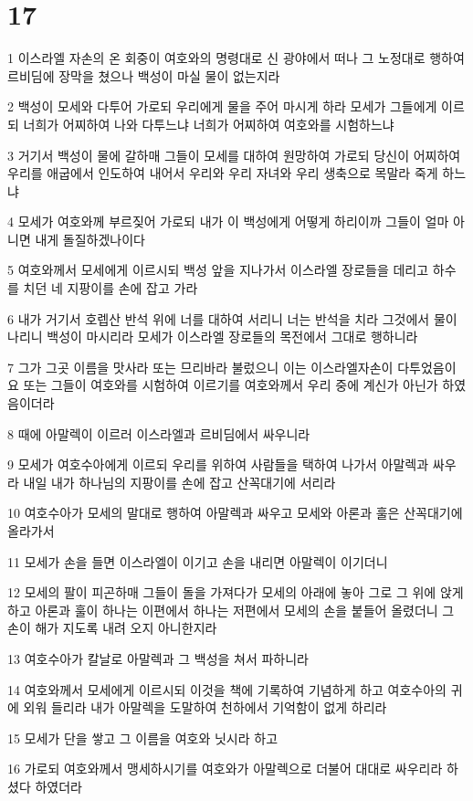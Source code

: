 \chapter{17}

\par 1 이스라엘 자손의 온 회중이 여호와의 명령대로 신 광야에서 떠나 그 노정대로 행하여 르비딤에 장막을 쳤으나 백성이 마실 물이 없는지라
\par 2 백성이 모세와 다투어 가로되 우리에게 물을 주어 마시게 하라 모세가 그들에게 이르되 너희가 어찌하여 나와 다투느냐 너희가 어찌하여 여호와를 시험하느냐
\par 3 거기서 백성이 물에 갈하매 그들이 모세를 대하여 원망하여 가로되 당신이 어찌하여 우리를 애굽에서 인도하여 내어서 우리와 우리 자녀와 우리 생축으로 목말라 죽게 하느냐
\par 4 모세가 여호와께 부르짖어 가로되 내가 이 백성에게 어떻게 하리이까 그들이 얼마 아니면 내게 돌질하겠나이다
\par 5 여호와께서 모세에게 이르시되 백성 앞을 지나가서 이스라엘 장로들을 데리고 하수를 치던 네 지팡이를 손에 잡고 가라
\par 6 내가 거기서 호렙산 반석 위에 너를 대하여 서리니 너는 반석을 치라 그것에서 물이 나리니 백성이 마시리라 모세가 이스라엘 장로들의 목전에서 그대로 행하니라
\par 7 그가 그곳 이름을 맛사라 또는 므리바라 불렀으니 이는 이스라엘자손이 다투었음이요 또는 그들이 여호와를 시험하여 이르기를 여호와께서 우리 중에 계신가 아닌가 하였음이더라
\par 8 때에 아말렉이 이르러 이스라엘과 르비딤에서 싸우니라
\par 9 모세가 여호수아에게 이르되 우리를 위하여 사람들을 택하여 나가서 아말렉과 싸우라 내일 내가 하나님의 지팡이를 손에 잡고 산꼭대기에 서리라
\par 10 여호수아가 모세의 말대로 행하여 아말렉과 싸우고 모세와 아론과 훌은 산꼭대기에 올라가서
\par 11 모세가 손을 들면 이스라엘이 이기고 손을 내리면 아말렉이 이기더니
\par 12 모세의 팔이 피곤하매 그들이 돌을 가져다가 모세의 아래에 놓아 그로 그 위에 앉게 하고 아론과 훌이 하나는 이편에서 하나는 저편에서 모세의 손을 붙들어 올렸더니 그 손이 해가 지도록 내려 오지 아니한지라
\par 13 여호수아가 칼날로 아말렉과 그 백성을 쳐서 파하니라
\par 14 여호와께서 모세에게 이르시되 이것을 책에 기록하여 기념하게 하고 여호수아의 귀에 외워 들리라 내가 아말렉을 도말하여 천하에서 기억함이 없게 하리라
\par 15 모세가 단을 쌓고 그 이름을 여호와 닛시라 하고
\par 16 가로되 여호와께서 맹세하시기를 여호와가 아말렉으로 더불어 대대로 싸우리라 하셨다 하였더라

